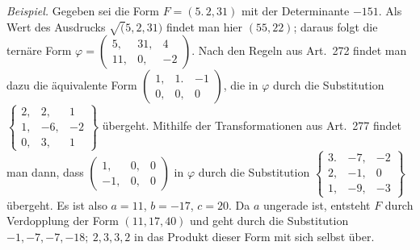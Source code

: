 \textit{Beispiel.} Gegeben sei die Form $F=(5.\,2,31)$ mit der Determinante
$-151$. Als Wert des Ausdrucks $\surd(5,2,31)$ findet man hier $(55,22)$;
daraus folgt die ternäre Form $\varphi=\left(\begin{smallmatrix}5,&31,&4\\11,&0,&-2\end{smallmatrix}\right)$. Nach den Regeln aus Art.\ 272
findet man dazu die äquivalente Form $\left(\begin{smallmatrix}1,&1.&-1\\0,&0,&0\end{smallmatrix}\right)$, die in $\varphi$ durch die
Substitution $\left\{\begin{smallmatrix}2,&2,&1\\1,&-6,&-2\\0,&3,&1\end{smallmatrix}\right\}$ übergeht. Mithilfe der Transformationen aus Art.\ 277 findet
man dann, dass $\left(\begin{smallmatrix}1,&0,&0\\-1,&0,&0\end{smallmatrix}\right)$ in $\varphi$ durch die Substitution $\left\{\begin{smallmatrix}3.&-7,&-2\\2,&-1,&0\\1,&-9,&-3\end{smallmatrix}\right\}$
übergeht. Es ist also $a=11$, $b=-17$, $c=20$. Da $a$ ungerade
ist, entsteht $F$ durch Verdopplung der Form $(11,17,40)$ und geht
durch die Substitution $-1,-7,-7,-18;\ 2,3,3,2$ in das Produkt dieser Form mit sich
selbst über.


